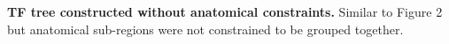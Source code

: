 \textbf{TF tree constructed without anatomical constraints.} 
Similar to Figure 2 but anatomical sub-regions were not constrained to be grouped together.
